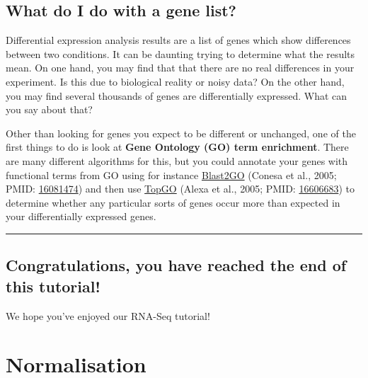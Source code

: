 \documentclass[11pt]{article}
\begin{document}
\hypertarget{what-do-i-do-with-a-gene-list}{%
\subsection{What do I do with a gene
list?}\label{what-do-i-do-with-a-gene-list}}

Differential expression analysis results are a list of genes which show
differences between two conditions. It can be daunting trying to
determine what the results mean. On one hand, you may find that that
there are no real differences in your experiment. Is this due to
biological reality or noisy data? On the other hand, you may find
several thousands of genes are differentially expressed. What can you
say about that?

Other than looking for genes you expect to be different or unchanged,
one of the first things to do is look at \textbf{Gene Ontology (GO) term
enrichment}. There are many different algorithms for this, but you could
annotate your genes with functional terms from GO using for instance
\url{Blast2GO} (Conesa et al., 2005; PMID:
\href{https://www.ncbi.nlm.nih.gov/pubmed/16081474}{16081474}) and then
use
\href{https://bioconductor.org/packages/release/bioc/html/topGO.html}{TopGO}
(Alexa et al., 2005; PMID:
\href{https://www.ncbi.nlm.nih.gov/pubmed/16606683}{16606683}) to
determine whether any particular sorts of genes occur more than expected
in your differentially expressed genes.

    \begin{center}\rule{0.5\linewidth}{0.5pt}\end{center}

    \hypertarget{congratulations-you-have-reached-the-end-of-this-tutorial}{%
\subsection{Congratulations, you have reached the end of this
tutorial!}\label{congratulations-you-have-reached-the-end-of-this-tutorial}}

We hope you've enjoyed our RNA-Seq tutorial!





\newpage





    \hypertarget{normalisation}{%
\section{Normalisation}\label{normalisation}}
\end{document}
